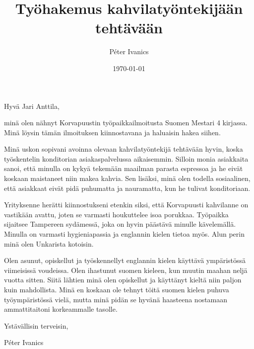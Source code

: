 \documentclass{article}
\title{Työhakemus kahvilatyöntekijään tehtävään}
\author{Péter Ivanics}
\date{\today}
\begin{document}
\maketitle

Hyvä Jari Anttila, 

minä olen nähnyt Korvapuustin työpaikkailmoitusta Suomen Mestari 4 kirjassa. Minä löysin tämän ilmoituksen kiinnostavana ja haluaisin hakea siihen. 

Minä uskon sopivani avoinna olevaan kahvilatyöntekijä tehtävään hyvin, koska työskentelin konditorian asiakaspalvelussa aikaisemmin. Silloin monia asiakkaita sanoi, että minulla on kykyä tekemään maailman parasta espressoa ja he eivät koskaan maistaneet niin makea kahvia. Sen lisäksi, minä olen todella sosiaalinen, että asiakkaat eivät pidä puhumatta ja nauramatta, kun he tulivat konditoriaan. 

Yrityksenne herätti kiinnostukseni etenkin siksi, että Korvapuusti kahvilanne on vastikään avattu, joten se varmasti houkuttelee isoa porukkaa. Työpaikka sijaitsee Tampereen sydämessä, joka on hyvin päästävä minulle kävelemällä. Minulla on varmasti hygieniapassia ja englannin kielen tietoa myös. Alun perin minä olen Unkarista kotoisin. 

Olen asunut, opiskellut ja työskennellyt englannin kielen käyttävä ympäristössä viimeisissä voudeissa. Olen ihastunut suomen kieleen, kun muutin maahan neljä vuotta sitten. Siitä lähtien minä olen opiskellut ja käyttänyt kieltä niin paljon kuin mahdollista. Minä en koskaan ole tehnyt töitä suomen kielen puhuva työympäristössä vielä, mutta minä pidän se hyvänä haasteena nostamaan ammattitaitoni korkeammalle tasolle. 

Ystävällisin terveisin,

Péter Ivanics
\end{document}
